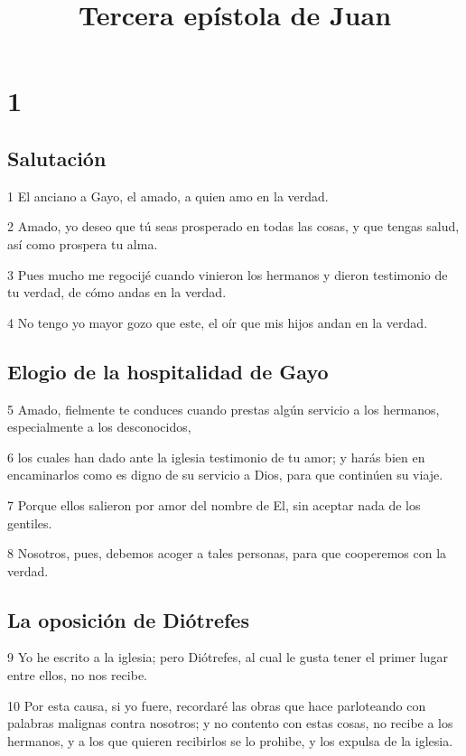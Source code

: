 
\title{Tercera epístola de Juan}

\chapter{1}

\section*{Salutación}

\par 1 El anciano a Gayo, el amado, a quien amo en la verdad.
\par 2 Amado, yo deseo que tú seas prosperado en todas las cosas, y que tengas salud, así como prospera tu alma.
\par 3 Pues mucho me regocijé cuando vinieron los hermanos y dieron testimonio de tu verdad, de cómo andas en la verdad.
\par 4 No tengo yo mayor gozo que este, el oír que mis hijos andan en la verdad.

\section*{Elogio de la hospitalidad de Gayo}

\par 5 Amado, fielmente te conduces cuando prestas algún servicio a los hermanos, especialmente a los desconocidos,
\par 6 los cuales han dado ante la iglesia testimonio de tu amor; y harás bien en encaminarlos como es digno de su servicio a Dios, para que continúen su viaje.
\par 7 Porque ellos salieron por amor del nombre de El, sin aceptar nada de los gentiles.
\par 8 Nosotros, pues, debemos acoger a tales personas, para que cooperemos con la verdad.

\section*{La oposición de Diótrefes}

\par 9 Yo he escrito a la iglesia; pero Diótrefes, al cual le gusta tener el primer lugar entre ellos, no nos recibe.
\par 10 Por esta causa, si yo fuere, recordaré las obras que hace parloteando con palabras malignas contra nosotros; y no contento con estas cosas, no recibe a los hermanos, y a los que quieren recibirlos se lo prohibe, y los expulsa de la iglesia.


